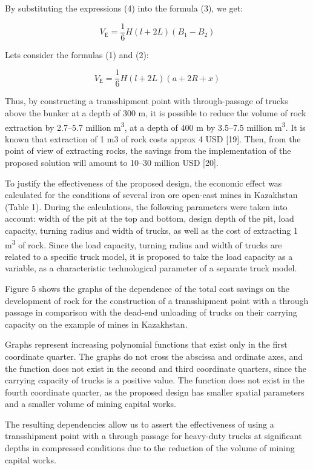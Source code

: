 \begin{multicols}{2}
By substituting the expressions (4) into the formula (3), we get:

\begin{equation}
V_{\text{Е}} = \frac{1}{6} H \left( l + 2L \right) \left( B_{1} - B_{2} \right)
\end{equation}

Let\textquotesingle s consider the formulas (1) and (2):

\begin{equation}
V_{\text{Е}} = \frac{1}{6} H \left( l + 2L \right) \left( a + 2R + x \right)
\end{equation}

Thus, by constructing a transshipment point with through-passage of
trucks above the bunker at a depth of 300 m, it is possible to reduce
the volume of rock extraction by 2.7--5.7 million m\textsuperscript{3},
at a depth of 400 m by 3.5--7.5 million m\textsuperscript{3}. It is
known that extraction of 1 m3 of rock costs approx 4 USD {[}19{]}. Then,
from the point of view of extracting rocks, the savings from the
implementation of the proposed solution will amount to 10--30 million
USD {[}20{]}.

To justify the effectiveness of the proposed design, the economic effect
was calculated for the conditions of several iron ore open-cast mines in
Kazakhstan (Table 1). During the calculations, the following parameters
were taken into account: width of the pit at the top and bottom, design
depth of the pit, load capacity, turning radius and width of trucks, as
well as the cost of extracting 1 m\textsuperscript{3} of rock. Since the
load capacity, turning radius and width of trucks are related to a
specific truck model, it is proposed to take the load capacity as a
variable, as a characteristic technological parameter of a separate
truck model.

Figure 5 shows the graphs of the dependence of the total cost savings on
the development of rock for the construction of a transshipment point
with a through passage in comparison with the dead-end unloading of
trucks on their carrying capacity on the example of mines in Kazakhstan.

Graphs represent increasing polynomial functions that exist only in the
first coordinate quarter. The graphs do not cross the abscissa and
ordinate axes, and the function does not exist in the second and third
coordinate quarters, since the carrying capacity of trucks is a positive
value. The function does not exist in the fourth coordinate quarter, as
the proposed design has smaller spatial parameters and a smaller volume
of mining capital works.

The resulting dependencies allow us to assert the effectiveness of using
a transshipment point with a through passage for heavy-duty trucks at
significant depths in compressed conditions due to the reduction of the
volume of mining capital works.
\end{multicols}

